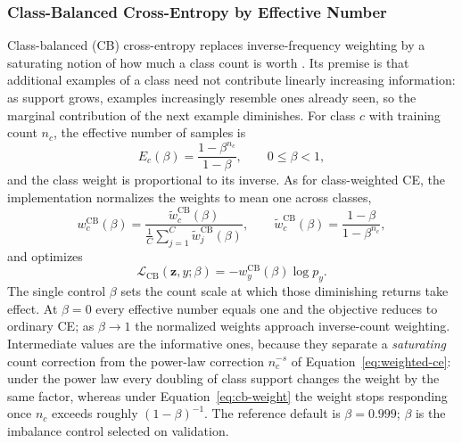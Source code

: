 \documentclass[11pt]{article}
\begin{document}
\subsubsection{Class-Balanced Cross-Entropy by Effective Number}
\label{sec:cb-ce}
Class-balanced (CB) cross-entropy replaces inverse-frequency weighting by a saturating notion of how much a class count is worth \citep{cui2019classBalanced}. Its premise is that additional examples of a class need not contribute linearly increasing information: as support grows, examples increasingly resemble ones already seen, so the marginal contribution of the next example diminishes. For class $c$ with training count $n_c$, the effective number of samples is
\begin{equation}
  E_c(\beta)=\frac{1-\beta^{n_c}}{1-\beta},
  \qquad 0\leq\beta<1,
  \label{eq:cb-effective-number}
\end{equation}
\noindent and the class weight is proportional to its inverse. As for class-weighted CE, the implementation normalizes the weights to mean one across classes,
\begin{equation}
  w_c^{\mathrm{CB}}(\beta)=
  \frac{\widetilde w_c^{\mathrm{CB}}(\beta)}
       {\frac{1}{C}\sum_{j=1}^{C}\widetilde w_j^{\mathrm{CB}}(\beta)},
  \qquad
  \widetilde w_c^{\mathrm{CB}}(\beta)=\frac{1-\beta}{1-\beta^{n_c}},
  \label{eq:cb-weight}
\end{equation}
\noindent and optimizes
\begin{equation}
  \mathcal{L}_{\mathrm{CB}}(\mathbf z,y;\beta)=-w_y^{\mathrm{CB}}(\beta)\log p_y.
  \label{eq:cb-ce}
\end{equation}
\noindent The single control $\beta$ sets the count scale at which those diminishing returns take effect. At $\beta=0$ every effective number equals one and the objective reduces to ordinary CE; as $\beta\rightarrow1$ the normalized weights approach inverse-count weighting. Intermediate values are the informative ones, because they separate a \emph{saturating} count correction from the power-law correction $n_c^{-s}$ of Equation~\eqref{eq:weighted-ce}: under the power law every doubling of class support changes the weight by the same factor, whereas under Equation~\eqref{eq:cb-weight} the weight stops responding once $n_c$ exceeds roughly $(1-\beta)^{-1}$. The reference default is $\beta=\num{0.999}$; $\beta$ is the imbalance control selected on validation.
\end{document}
